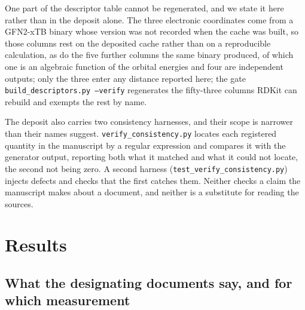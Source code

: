 \documentclass[journal=ancham,manuscript=article,margin=1in]{achemso}
\begin{document}
One part of the descriptor table cannot be regenerated, and we state it here
rather than in the deposit alone. The three electronic coordinates come from a
GFN2-xTB binary whose version was not recorded when the cache was built, so
those columns rest on the deposited cache rather than on a reproducible
calculation, as do the five further columns the same binary produced, of which
one is an algebraic function of the orbital energies and four are independent
outputs; only the three enter any distance reported here; the gate
\texttt{build\_descriptors.py --verify} regenerates the fifty-three columns
RDKit can rebuild and exempts the rest by name.

\begingroup\sloppy
The deposit also carries two consistency harnesses, and their scope is narrower
than their names suggest. \texttt{verify\_consistency.py} locates each
registered quantity in the manuscript by a regular expression and compares it
with the generator output, reporting both what it matched and what it could not
locate, the second not being zero. A second harness
(\texttt{test\_verify\_consistency.py}) injects defects and checks that the
first catches them. Neither checks a claim the
manuscript makes about a document, and neither is a substitute for reading the
sources.
\endgroup

\section{Results}

\subsection{What the designating documents say, and for which measurement}
\label{res:docs}
\end{document}
